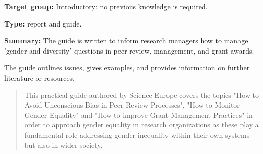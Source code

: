 \documentclass{article}
\begin{document}
\textbf{Target group:} Introductory: no previous knowledge is required.


\textbf{Type:} report and guide.


\textbf{Summary:} The guide is written to inform research managers how to manage 'gender and diversity' questions in peer review, management, and grant awards.


The guide outlines issues, gives examples, and provides information on further literature or resources.

\begin{quote}



This practical guide authored by Science Europe covers the topics "How to Avoid Unconscious Bias in Peer Review Processes", "How to Monitor Gender Equality" and "How to improve Grant Management Practices" in order to approach gender equality in research organizations as these play a fundamental role addressing gender inequality within their own systems but also in wider society.


\end{quote}


\printbibliography[title={Bibliography}]
\end{document}
